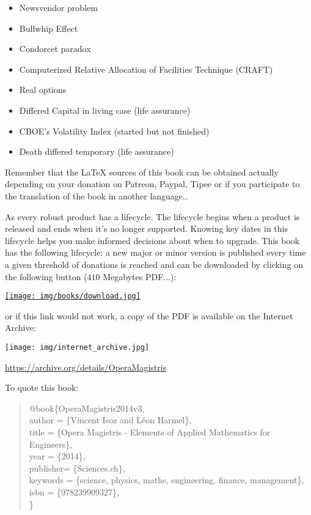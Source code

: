 \begin{itemize}
\begin{itemize}
				\item Newsvendor problem
				\item Bullwhip Effect
				\item Condorcet paradox	
				\item Computerized Relative Allocation of Facilities Technique (CRAFT)
				\item Real options
				\item Differed Capital in living case (life assurance)
				\item CBOE's Volatility Index (started but not finished)
				\item Death differed temporary (life assurance)
			\end{itemize}
	\end{itemize}
	Remember that the \LaTeX{} sources of this book can be obtained actually depending on your donation on Patreon, Paypal, Tipee or if you participate to the translation of the book in another language..
	
	As every robust product has a lifecycle. The lifecycle begins when a product is released and ends when it's no longer supported. Knowing key dates in this lifecycle helps you make informed decisions about when to upgrade. This book has the following lifecycle: a new major or minor version is published every time a given threshold of donations is reached and can be downloaded by clicking on the following button ($410$ Megabytes PDF...):
	\begin{center}
		\href{http://www.sciences.ch/htmlfr/php/cliccount/click.php?id=317}{\texttt{[image: img/books/download.jpg]}}
	\end{center}
	or if this link would not work, a copy of the PDF is available on the Internet Archive:
	\begin{center}
		\texttt{[image: img/internet\_archive.jpg]}
	\end{center}
	\begin{center}
	\href{https://archive.org/details/OperaMagistris}{https://archive.org/details/OperaMagistris}
	\end{center}
	
	To quote this book:
	\begin{quote}
	\noindent @book\{OperaMagistris2014v3, \\
		  author =       \{Vincent Isoz and Léon Harmel\}, \\
		  title =        \{Opera Magistris - Elements of Applied Mathematics for Engineers\}, \\
		  year =         \{2014\}, \\
	      publisher=     \{Sciences.ch\}, \\
		  keywords =     \{science, physics, maths, engineering, finance, management\}, \\
		  isbn =          \{978239909327\},\\
	\}
	\end{quote}